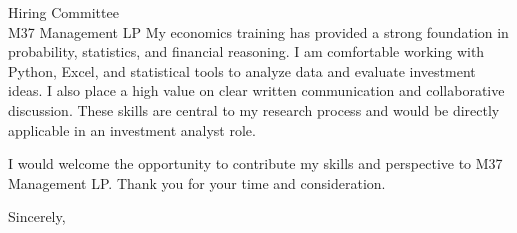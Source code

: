 \documentclass[11pt]{letter}
\begin{document}
\begin{letter}{Hiring Committee \\ M37 Management LP}
My economics training has provided a strong foundation in probability, statistics, and financial reasoning. I am comfortable working with Python, Excel, and statistical tools to analyze data and evaluate investment ideas. I also place a high value on clear written communication and collaborative discussion. These skills are central to my research process and would be directly applicable in an investment analyst role.

I would welcome the opportunity to contribute my skills and perspective to M37 Management LP. Thank you for your time and consideration.

\closing{Sincerely,}

\end{letter}
\end{document}
